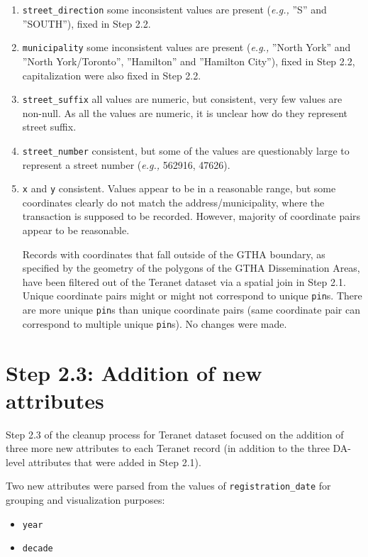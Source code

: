 \documentclass[11pt]{article}
\begin{document}
\begin{enumerate}
        \item \texttt{street\_direction} \textemdash some inconsistent values are present (\textit{e.g.,} ''S'' and ''SOUTH''), fixed in Step 2.2.
        \item \texttt{municipality} \textemdash some inconsistent values are present (\textit{e.g.,} ''North York'' and ''North York/Toronto'', ''Hamilton'' and ''Hamilton City''), fixed in Step 2.2, capitalization were also fixed in Step 2.2.
        \item \texttt{street\_suffix} \textemdash all values are numeric, but consistent, very few values are non-null.
        As all the values are numeric, it is unclear how do they represent street suffix.
        \item \texttt{street\_number} \textemdash consistent, but some of the values are questionably large to represent a street number (\textit{e.g.,} 562916, 47626).
        \item \texttt{x} and \texttt{y} \textemdash consistent.
        Values appear to be in a reasonable range, but some coordinates clearly do not match the address/municipality, where the transaction is supposed to be recorded.
        However, majority of coordinate pairs appear to be reasonable.

        Records with coordinates that fall outside of the GTHA boundary, as specified by the geometry of the polygons of the GTHA Dissemination Areas, have been filtered out of the Teranet dataset via a spatial join in Step 2.1.
        Unique coordinate pairs might or might not correspond to unique \texttt{pin}s.
        There are more unique \texttt{pin}s than unique coordinate pairs (same coordinate pair can correspond to multiple unique \texttt{pin}s).
        No changes were made.
    \end{enumerate}

    \section{Step 2.3: Addition of new attributes} \label{sec:teranet_new_cols}

    Step 2.3 of the cleanup process for Teranet dataset focused on the addition of three more new attributes to each Teranet record (in addition to the three DA-level attributes that were added in Step 2.1).

    \vspace{5mm}

    Two new attributes were parsed from the values of \texttt{registration\_date} for grouping and visualization purposes:
    \begin{itemize}
        \item \texttt{year}
        \item \texttt{decade}
    \end{itemize}
\end{document}
